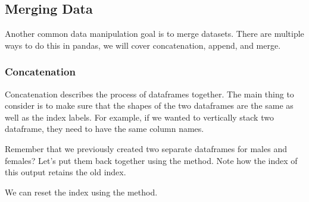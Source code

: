 \documentclass[letterpaper,10pt,english]{sphinxmanual}
\begin{document}
\subsection{Merging Data}
\label{\detokenize{content/Introduction_to_Pandas:merging-data}}
Another common data manipulation goal is to merge datasets. There are multiple ways to do this in pandas, we will cover concatenation, append, and merge.


\subsubsection{Concatenation}
\label{\detokenize{content/Introduction_to_Pandas:concatenation}}
Concatenation describes the process of  dataframes together. The main thing to consider is to make sure that the shapes of the two dataframes are the same as well as the index labels. For example, if we wanted to vertically stack two dataframe, they need to have the same column names.

Remember that we previously created two separate dataframes for males and females?  Let’s put them back together using the  method. Note how the index of this output retains the old index.

\begin{sphinxVerbatim}[commandchars=\\\{\}]
  \PYG{p}{[} \PYG{p}{]}   
\end{sphinxVerbatim}

We can reset the index using the  method.

\begin{sphinxVerbatim}[commandchars=\\\{\}]
\PYG{p}{[} \PYG{p}{]}   
\end{sphinxVerbatim}
\end{document}
